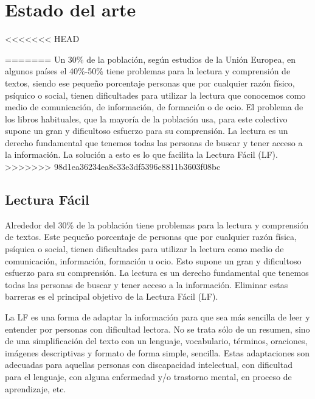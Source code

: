\chapter{Estado del arte}
\label{cap:estadoDeLaCuestion}

<<<<<<< HEAD

=======
Un 30\% de la población, según estudios de la Unión Europea, en algunos países el 40\%-50\% tiene problemas para la lectura y comprensión de textos, siendo ese pequeño porcentaje personas que por cualquier razón físico, psíquico o social, tienen dificultades para utilizar la lectura que conocemos como medio de comunicación, de información, de formación o de ocio. El problema de los libros habituales, que la mayoría de la población usa, para este colectivo supone un gran y dificultoso esfuerzo para su comprensión. La lectura es un derecho fundamental que tenemos todas las personas de buscar y tener acceso a la información. La solución a esto es lo que facilita la Lectura Fácil (LF).
>>>>>>> 98d1ea36234ea8e33e3df5396c8811b3603f08bc



\section{Lectura Fácil}
Alrededor del 30\% de la población tiene problemas para la lectura y comprensión de textos. Este pequeño porcentaje de personas que por cualquier razón física, psíquica o social, tienen dificultades para utilizar la lectura como medio de comunicación, información, formación u ocio. Esto supone un gran y dificultoso esfuerzo para su comprensión. La lectura es un derecho fundamental que tenemos todas las personas de buscar y tener acceso a la información. Eliminar estas barreras es el principal objetivo de la Lectura Fácil (LF).

La LF es una forma de adaptar la información para que sea más sencilla de leer y entender por personas con dificultad lectora. No se trata sólo de un resumen, sino de una simplificación del texto con un lenguaje, vocabulario, términos, oraciones, imágenes descriptivas y formato de forma simple, sencilla. Estas adaptaciones son adecuadas para aquellas personas con discapacidad intelectual, con dificultad para el lenguaje, con alguna enfermedad y/o trastorno mental, en proceso de aprendizaje, etc.

